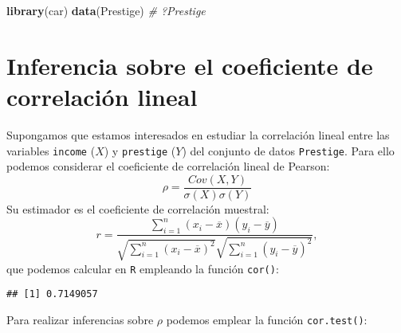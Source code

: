 \documentclass[
]{book}
\newenvironment{Shaded}{\begin{snugshade}}{\end{snugshade}}
\newcommand{\CommentTok}[1]{\textcolor[rgb]{0.56,0.35,0.01}{\textit{#1}}}
\newcommand{\KeywordTok}[1]{\textcolor[rgb]{0.13,0.29,0.53}{\textbf{#1}}}
\newcommand{\NormalTok}[1]{#1}
\newcommand{\OperatorTok}[1]{\textcolor[rgb]{0.81,0.36,0.00}{\textbf{#1}}}
\theoremstyle{definition}
\theoremstyle{definition}
\theoremstyle{definition}
\theoremstyle{remark}
\begin{document}
\begin{Shaded}
\begin{Highlighting}[]
\KeywordTok{library}\NormalTok{(car)}
\KeywordTok{data}\NormalTok{(Prestige)}
\CommentTok{# ?Prestige}
\end{Highlighting}
\end{Shaded}

\hypertarget{inferencia-sobre-el-coeficiente-de-correlaciuxf3n-lineal}{%
\section{Inferencia sobre el coeficiente de correlación lineal}\label{inferencia-sobre-el-coeficiente-de-correlaciuxf3n-lineal}}

Supongamos que estamos interesados en estudiar la correlación lineal
entre las variables \texttt{income} (\(X\)) y \texttt{prestige} (\(Y\))
del conjunto de datos \texttt{Prestige}.
Para ello podemos considerar el coeficiente de correlación lineal de Pearson:
\[\rho =\frac{ Cov \left( X, Y \right) }
{ \sigma \left( X \right) \sigma \left( Y \right) }\]
Su estimador es el coeficiente de correlación muestral:
\[r=\frac{\sum_{i=1}^{n}(x_i-\overline{x})(y_i-\overline{y})}
{\sqrt{ \sum_{i=1}^{n}(x_i-\overline{x})^{2}} 
\sqrt{\sum_{i=1}^{n}(y_i-\overline{y})^{2}}},\]
que podemos calcular en \texttt{R} empleando la función \texttt{cor()}:

\begin{Shaded}
\end{Shaded}

\begin{verbatim}
## [1] 0.7149057
\end{verbatim}

Para realizar inferencias sobre \(\rho\) podemos emplear la función
\texttt{cor.test()}:

\begin{Shaded}
\end{Shaded}
\end{document}
